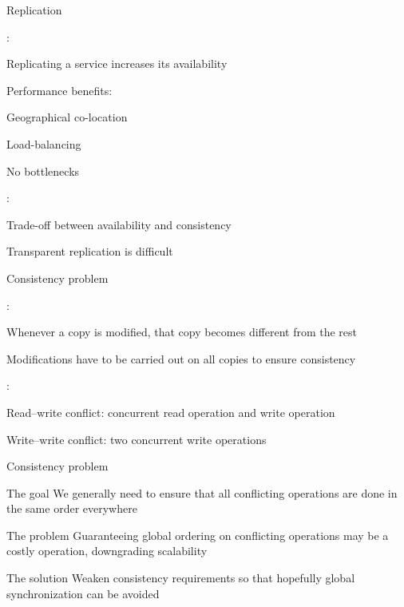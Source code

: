 \begin{frame}{Replication}

:\\
\BIL
\item Replicating a service increases its availability
\item Performance benefits:
  \BI
  \item Geographical co-location
  \item Load-balancing
  \item No bottlenecks
  \EI
\EIL

\bigskip
{}:\\
\BIL
\item Trade-off between availability and consistency
\item Transparent replication is difficult
\EIL

\end{frame}


\begin{frame}{Consistency problem}

:\\
\BI
\item Whenever a copy is modified, that copy becomes different from the rest
\item Modifications have to be carried out on all copies to ensure consistency
\EI


:\\
\BI
\item \alert{Read–write conflict}: concurrent read operation and write operation 
\item \alert{Write–write conflict}: two concurrent write operations	
\EI

\end{frame}

\begin{frame}{Consistency problem}

\begin{block}{The goal}
We generally need to ensure that all conflicting operations are done 
in the same order everywhere
\end{block}

\begin{block}{The problem}
Guaranteeing global ordering on conflicting operations may be a costly operation, downgrading scalability
\end{block}

\begin{block}{The solution}
Weaken consistency requirements so that hopefully global synchronization can be avoided
\end{block}

\end{frame}

